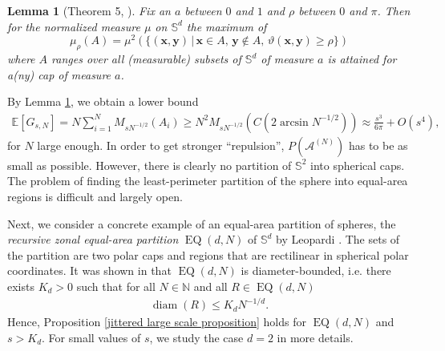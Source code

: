 \documentclass[a4paper,11pt]{amsart}
\newtheorem{lemma}{Lemma}
\begin{document}
\begin{lemma}[Theorem 5, \cite{Feige2002}]\label{M for caps}
    Fix an $a$ between $0$ and $1$ and $\rho$ between $0$ and $\pi$. Then for the normalized measure $\mu$ on $\mathbb{S}^d$ the maximum of
$$\mu_\rho(A)=\mu^2\left( \{(\mathbf{x},\mathbf{y})\,|\, \mathbf{x}\in A,\, \mathbf{y}\not\in A,\, \vartheta(\mathbf{x},\mathbf{y})\geq\rho\}\right) $$ 
where $A$ ranges over all (measurable) subsets of $\mathbb{S}^d$ of measure $a$ is attained for
a(ny) cap of measure $a$.
\end{lemma}

By Lemma \ref{M for caps}, we obtain a lower bound
\begin{align*}
 \mathbb{E}[G_{s,N}]=N \sum\limits_{i=1}^N M_{sN^{-1/2}}(A_i)\geq N^2 M_{sN^{-1/2}}(C(2\arcsin N^{-1/2}))\approx\frac{s^3}{6\pi}+O(s^4),
\end{align*}
for $N$ large enough.
In order to get stronger ``repulsion'', $P(\mathcal{A}^{(N)})$ has to be as small as possible. However, there is clearly no partition of $\mathbb{S}^2$ into spherical caps. The problem of finding the least-perimeter partition of the sphere into equal-area regions is difficult and largely open. 

Next, we consider a concrete example of an equal-area partition of spheres, the \textit{recursive zonal equal-area partition} $\operatorname{EQ}(d,N)$ of $\mathbb{S}^d$ by Leopardi \cite{Leopardi2006}. The sets of the partition are two polar caps and regions that are rectilinear in spherical polar coordinates.  It was shown in \cite{Leopardi} that $\operatorname{EQ}(d,N)$ is diameter-bounded, i.e. there exists $K_d>0$ such that for all $N\in\mathbb{N}$ and all $R\in\operatorname{EQ}(d,N)$
\begin{align}\label{diameter bounds for EQ}
    \operatorname{diam}(R)\leq K_dN^{-1/d}.
\end{align}
Hence, Proposition \ref{jittered large scale proposition} holds for $\operatorname{EQ}(d,N)$ and $s>K_d$. For small values of $s$, we study the case $d=2$ in more details.
\end{document}
